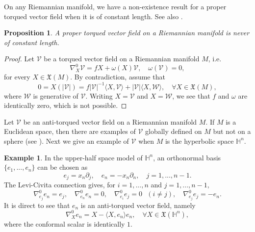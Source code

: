 \documentclass[12pt]{amsart}
\def\h{\mathbb H}
\newtheorem{proposition}[theorem]{Proposition}
\theoremstyle{definition}
\newtheorem{example}[theorem]{Example}
\begin{document}
On any Riemannian manifold, we have a non-existence result for a proper torqued vector field when it is of constant length. See also \cite[Theorem 3]{ag}.

\begin{proposition} \label{torq-nonconst}
A proper torqued vector field on a Riemannian manifold is never of constant length.
\end{proposition}

\begin{proof}
Let $\mathcal{V}$ be a torqued vector field on a Riemannian manifold $M$, i.e.
\begin{equation*}
 \nabla^0_X\mathcal{V}=fX+\omega(X)\mathcal{V}, \quad \omega(\mathcal{V})=0,   
\end{equation*}
for every $X\in\mathfrak{X}(M)$. By contradiction, assume that
\begin{equation*}
0=X(|\mathcal{V}|)=f|\mathcal{V}|^{-1}\langle X,\mathcal{V} \rangle +|\mathcal{V}|\langle X,\mathcal{W} \rangle , \quad \forall X \in \mathfrak{X}(M),  
\end{equation*}
where $\mathcal{W}$ is generative of $\mathcal{V}$. Writing $X=\mathcal{V}$ and $X=\mathcal{W}$, we see that $f$ and $\omega$ are identically zero, which is not possible.
\end{proof}


Let $\mathcal{V}$ be an anti-torqued vector field on a Riemannian manifold $M$. If $M$ is a Euclidean space, then there are examples of $\mathcal{V}$ globally defined on $M$ but not on a sphere (see \cite{dan}). Next we give an example of $\mathcal{V}$ when $M$ is the hyperbolic space $\h^n$. 
\begin{example} \label{ex3.1}
In the upper-half space model of $\h^n$, an orthonormal basis $\{e_1,...,e_n \}$ can be chosen as
\begin{equation*}
e_j=x_n\partial _j, \quad e_n=-x_n\partial _n, \quad j=1,...,n-1.    
\end{equation*}
The Levi-Civita connection gives, for $i=1,...,n$ and $j=1,...,n-1,$ 
\begin{equation*}
\nabla^0 _{e_j}e_{n}=e_j, \quad \nabla^0 _{e_n}e_n=0, \quad \nabla^0
_{e_i}e_j=0 \text{ } (i\neq j), \quad \nabla^0 _{e_j}e_j=-e_n.   
\end{equation*}
It is direct to see that $e_n$ is an anti-torqued vector field, namely
\begin{equation*}
\nabla^0 _{X}e_n =X-\langle X,e_{n}\rangle e_n, \quad \forall X\in \mathfrak{X}(\h^n),    
\end{equation*}
where the conformal scalar is identically $1$.
\end{example}
\end{document}

